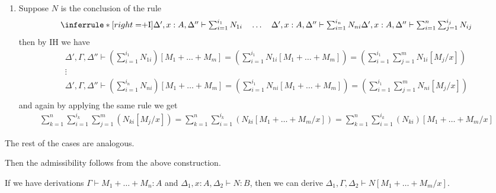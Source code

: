 \begin{definition}[Substitution]
\begin{enumerate}
\[  \]
  and w.l.o.g suppose $x : A \in \Delta_1$, then by IH we have a derivation 
  \[
    \Delta'_1, \Gamma, \Delta''_1 \vdash (\sum_{i=1}^{p}P_i)[M_1 + \ldots + M_m] = (\sum_{i=1}^{p} \sum_{j=1}^{m}P_i[M_j / x]) : A
  \]
  and by applying the same rule we get
  \begin{gather*}
    \Delta'_1,\Gamma,\Delta''_1,\Delta_2 \vdash \sum_{i=1}^{p}\sum_{k=1}^{m}\sum_{j=1}^{n}\{P_i[M_j / x],N_j\} = \sum_{i=1}^{p}\sum_{j=1}^{n}\{P_i[M_1 + \ldots + M_m / x],N_j\} = \\
    = \sum_{i=1}^{p}\sum_{j=1}^{n}\{P_i,N_j\}[M_1 + \ldots + M_m / x]
  \end{gather*}
  \item Suppose $N$ is the conclusion of the rule
  \[
    \inferrule*[right=$+I$]{\Delta', x : A, \Delta'' \vdash \sum_{i=1}^{i_1} N_{1i} \quad \ldots \quad \Delta', x : A, \Delta'' \vdash \sum_{i=1}^{i_n} N_{ni}}{\Delta', x : A, \Delta'' \vdash \sum_{i=1}^{n}\sum_{j=1}^{i_j} N_{ij}}
  \]
  then by IH we have 
  \begin{gather*}
  \Delta',\Gamma,\Delta'' \vdash (\sum_{i=1}^{i_1}N_{1i})[M_1 + \ldots + M_m] = (\sum_{i=1}^{i_1}N_{1i}[M_1 + \ldots + M_m]) = (\sum_{i=1}^{i_1}\sum_{j=1}^{m}N_{1i}[M_j / x])\\
  \vdots\\
  \Delta',\Gamma,\Delta'' \vdash (\sum_{i=1}^{i_n}N_{ni})[M_1 + \ldots + M_m] = (\sum_{i=1}^{i_1}N_{ni}[M_1 + \ldots + M_m]) = (\sum_{i=1}^{i_1}\sum_{j=1}^{m}N_{ni}[M_j / x])\\
  \end{gather*}
  and again by applying the same rule we get
  \begin{gather*}
    \sum_{k=1}^{n}\sum_{i=1}^{i_k}\sum_{j=1}^{m}(N_{ki}[M_j / x]) = \sum_{k=1}^{n}\sum_{i=1}^{i_k}(N_{ki}[M_1 + \ldots + M_m / x]) = \sum_{k=1}^{n}\sum_{i=1}^{i_k}(N_{ki})[M_1 + \ldots + M_m / x]
  \end{gather*}
  \end{enumerate}
  The rest of the cases are analogous.
\end{definition}

Then the admissibility follows from the above construction.
\begin{lemma}
  If we have derivations $\Gamma \vdash M_1 + \ldots + M_n : A$ and $\Delta_1, x : A, \Delta_2 \vdash N : B$, then we can derive $\Delta_1, \Gamma, \Delta_2 \vdash N[M_1 + \ldots + M_m / x]$.
\end{lemma}

